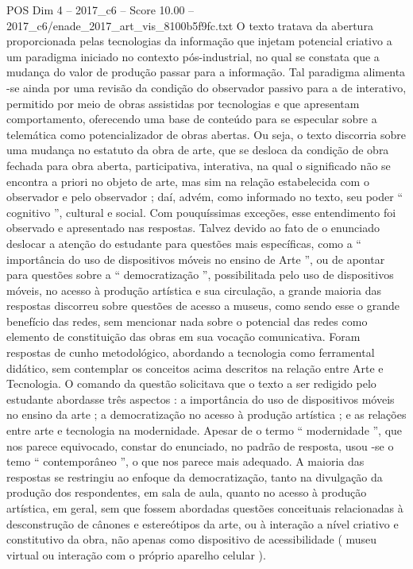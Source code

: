 \begin{textsample}{POS Dim 4 – 2017\_c6 – Score 10.00 – 2017\_c6/enade\_2017\_art\_vis\_8100b5f9fc.txt}
O texto tratava da abertura proporcionada pelas tecnologias da informação que injetam potencial criativo a um paradigma iniciado no contexto pós-industrial, no qual se constata que a mudança do valor de produção passar para a informação.
Tal paradigma alimenta -se ainda por uma revisão da condição do observador passivo para a de interativo, permitido por meio de obras assistidas por tecnologias e que apresentam comportamento, oferecendo uma base de conteúdo para se especular sobre a telemática como potencializador de obras abertas.
Ou seja, o texto discorria sobre uma mudança no estatuto da obra de arte, que se desloca da condição de obra fechada para obra aberta, participativa, interativa, na qual o significado não se encontra a priori no objeto de arte, mas sim na relação estabelecida com o observador e pelo observador ; daí, advém, como informado no texto, seu poder “ cognitivo ”, cultural e social.
Com pouquíssimas exceções, esse entendimento foi observado e apresentado nas respostas.
Talvez devido ao fato de o enunciado deslocar a atenção do estudante para questões mais específicas, como a “ importância do uso de dispositivos móveis no ensino de Arte ”, ou de apontar para questões sobre a “ democratização ”, possibilitada pelo uso de dispositivos móveis, no acesso à produção artística e sua circulação, a grande maioria das respostas discorreu sobre questões de acesso a museus, como sendo esse o grande benefício das redes, sem mencionar nada sobre o potencial das redes como elemento de constituição das obras em sua vocação comunicativa.
Foram respostas de cunho metodológico, abordando a tecnologia como ferramental didático, sem contemplar os conceitos acima descritos na relação entre Arte e Tecnologia.
O comando da questão solicitava que o texto a ser redigido pelo estudante abordasse três aspectos : a importância do uso de dispositivos móveis no ensino da arte ; a democratização no acesso à produção artística ; e as relações entre arte e tecnologia na modernidade.
Apesar de o termo “ modernidade ”, que nos parece equivocado, constar do enunciado, no padrão de resposta, usou -se o temo “ contemporâneo ”, o que nos parece mais adequado.
A maioria das respostas se restringiu ao enfoque da democratização, tanto na divulgação da produção dos respondentes, em sala de aula, quanto no acesso à produção artística, em geral, sem que fossem abordadas questões conceituais relacionadas à desconstrução de cânones e estereótipos da arte, ou à interação a nível criativo e constitutivo da obra, não apenas como dispositivo de acessibilidade ( museu virtual ou interação com o próprio aparelho celular ).

\end{textsample}
